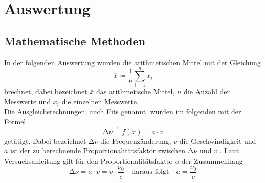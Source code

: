 \section{Auswertung}
\label{sec:Auswertung}
\subsection{Mathematische Methoden}
In der folgenden Auswertung wurden die arithmetischen Mittel mit der
Gleichung
\begin{equation}
  \bar{x} \coloneq \frac{1}{n} \sum_{i=1}^n x_i
  \label{eqn:aM}
\end{equation}
brechnet, dabei bezeichnet $\bar{x}$ das arithmetische Mittel, $n$ die Anzahl
der Messwerte und $x_i$ die einzelnen Messwerte. \\
Die Ausgleichsrechnungen, auch Fits genannt, wurden im folgenden mit der
Formel
\begin{equation}
  \increment \nu \stackrel{!}{=} f(x) = a\cdot v
  \label{eqn:fit}
\end{equation}
getätigt. Dabei bezeichnet $\increment \nu$ die Frequenzänderung, $v$ die
Geschwindigkeit und $a$ ist der zu berechnende Proportionalitätsfaktor zwischen
$ \increment \nu $ und $v$ . Laut Versuchsanleitung \cite{Anleitung} gilt für den
Proportionalitätsfaktor $a$ der Zusammenhang
\begin{equation*}
  \increment \nu = a\cdot v = v\cdot\frac{\nu_0}{c} \quad \text{daraus folgt} \quad
  a = \frac{\nu_0}{c}
\end{equation*}
